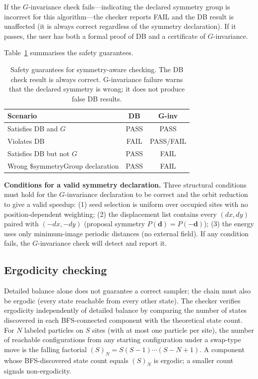 \documentclass[twocolumn,10pt]{article}
\begin{document}
If the $G$-invariance check fails---indicating the declared symmetry group
is incorrect for this algorithm---the checker reports FAIL and the DB result
is unaffected (it is always correct regardless of the symmetry declaration).
If it passes, the user has both a formal proof of DB and a certificate of
$G$-invariance.

Table~\ref{tab:symmetry} summarises the safety guarantees.

\begin{table}[t]
  \centering
  \caption{Safety guarantees for symmetry-aware checking.  The DB check
    result is always correct.  G-invariance failure warns that the declared
    symmetry is wrong; it does not produce false DB results.}
  \label{tab:symmetry}
  \small
  \setlength{\tabcolsep}{3pt}
  \begin{tabular}{@{}p{3.0cm}cc@{}}
    \toprule
    Scenario & DB & G-inv \\
    \midrule
    Satisfies DB and $G$ & PASS & PASS \\
    Violates DB & FAIL & PASS/FAIL \\
    Satisfies DB but not $G$ & PASS & FAIL \\
    Wrong $\$\mathrm{symmetryGroup}$ declaration & PASS & FAIL \\
    \bottomrule
  \end{tabular}
\end{table}

\medskip\noindent\textbf{Conditions for a valid symmetry declaration.}
Three structural conditions must hold for the $G$-invariance declaration to
be correct and the orbit reduction to give a valid speedup:
(1) seed selection is uniform over occupied sites with no position-dependent
weighting;
(2) the displacement list contains every $(dx,dy)$ paired with $(-dx,-dy)$
(proposal symmetry $P(\mathbf{d})=P(-\mathbf{d})$);
(3) the energy uses only minimum-image periodic distances (no external field).
If any condition fails, the $G$-invariance check will detect and report it.

\subsection{Ergodicity checking}
\label{sec:ergodicity}

Detailed balance alone does not guarantee a correct sampler; the chain must
also be ergodic (every state reachable from every other state).  The checker
verifies ergodicity independently of detailed balance by comparing the number
of states discovered in each BFS-connected component with the theoretical
state count.  For $N$ labeled particles on $S$ sites (with at most one
particle per site), the number of reachable configurations from any starting
configuration under a swap-type move is the falling factorial $(S)_N =
S(S-1)\cdots(S-N+1)$.  A component whose BFS-discovered state count equals
$(S)_N$ is ergodic; a smaller count signals non-ergodicity.
\end{document}
